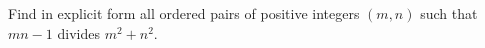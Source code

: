 Find in explicit form all ordered pairs of positive integers $(m, n)$ such that $mn-1$ divides $m^2 + n^2$.